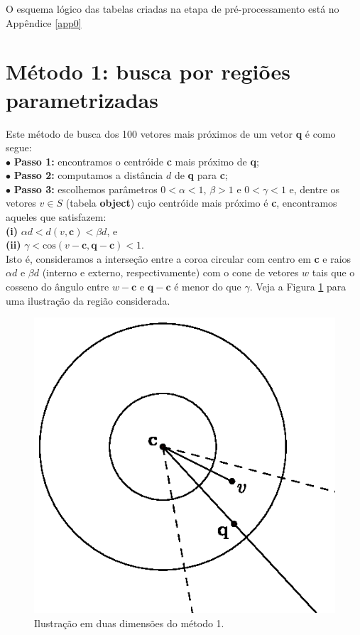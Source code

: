 \documentclass[a4paper,12pt,titlepage]{scrartcl}
\begin{document}
O esquema lógico das tabelas criadas na etapa de pré-processamento está no Appêndice \ref{app0}


\section{Método 1: busca por regiões parametrizadas}

Este método de busca dos 100 vetores mais próximos de um vetor \textbf{q} é como segue:\\

\noindent$\bullet$ \textbf{Passo 1:} encontramos o centróide \textbf{c} mais próximo de \textbf{q};\\

\noindent$\bullet$ \textbf{Passo 2:} computamos a distância $d$ de \textbf{q} para \textbf{c};\\

\noindent$\bullet$ \textbf{Passo 3:} escolhemos parâmetros $0 < \alpha < 1$, $\beta > 1$ e $0 < \gamma < 1$ e, dentre os vetores $v \in S$ (tabela \textbf{object}) cujo centróide mais próximo é \textbf{c}, encontramos aqueles que satisfazem:\\

\noindent\textbf{(i)} $\alpha d < d(v,\mathbf{c}) < \beta d$, e \\

\noindent\textbf{(ii)} $\gamma < \mathrm{cos}(v-\mathbf{c},\mathbf{q}-\mathbf{c}) < 1$.\\

Isto é, consideramos a interseção entre a coroa circular com centro em \textbf{c} e raios $\alpha d$ e $\beta d$ (interno e externo, respectivamente) com o cone de vetores $w$ tais que o cosseno do ângulo entre $w - \mathbf{c}$ e $\mathbf{q} - \mathbf{c}$ é menor do que $\gamma$. Veja a Figura \ref{figmetodo1} para uma ilustração da região considerada.

\begin{figure}[h]
\centering
\includegraphics{metodo1.eps}
\caption{Ilustração em duas dimensões do método 1.}
\label{figmetodo1}
\end{figure}
\end{document}

